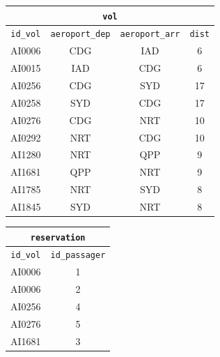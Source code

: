 \begin{table}[h]
    \begin{minipage}[t]{0.48\textwidth}
        \centering
        \small %
        \begin{tabular}{|c|c|c|c|}
            \hline
            \multicolumn{4}{|c|}{\texttt{vol}} \\ \hline
            \texttt{id\_vol} & \texttt{aeroport\_dep} & \texttt{aeroport\_arr} & \texttt{dist} \\ \hline
            AI0006  & CDG & IAD & 6  \\ \hline
            AI0015  & IAD & CDG & 6  \\ \hline
            AI0256 & CDG & SYD & 17 \\ \hline
            AI0258 & SYD & CDG & 17 \\ \hline
            AI0276  & CDG & NRT & 10 \\ \hline
            AI0292  & NRT & CDG & 10 \\ \hline
            AI1280  & NRT & QPP & 9  \\ \hline
            AI1681  & QPP & NRT & 9  \\ \hline
            AI1785  & NRT & SYD & 8  \\ \hline
            AI1845  & SYD & NRT & 8  \\ \hline
        \end{tabular}
    \end{minipage}
    \hfill
    \begin{minipage}[t]{0.48\textwidth}
        \centering
        \begin{tabular}{|c|c|}
            \hline
            \multicolumn{2}{|c|}{\texttt{reservation}} \\ \hline
            \texttt{id\_vol} & \texttt{id\_passager} \\ \hline
            AI0006 & 1 \\ \hline
            AI0006 & 2 \\ \hline
            AI0256 & 4 \\ \hline
            AI0276 & 5 \\ \hline
            AI1681 & 3 \\ \hline
        \end{tabular}
    \end{minipage}

\end{table}
